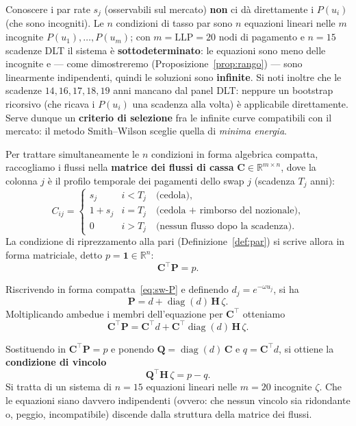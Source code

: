 \documentclass[11pt,a4paper]{article}
\theoremstyle{plain}
\theoremstyle{definition}
\theoremstyle{remark}
\newcommand{\LLP}{\ensuremath{\mathrm{LLP}}}
\newcommand{\Qmat}{\mathbf{Q}}
\newcommand{\Hmat}{\mathbf{H}}
\newcommand{\transp}{^{\!\top}}
\begin{document}
Conoscere i par rate $s_j$ (osservabili sul mercato) \textbf{non} ci d\`a direttamente i
$P(u_i)$ (che sono incogniti). Le $n$ condizioni di tasso par sono $n$ equazioni lineari nelle $m$
incognite $P(u_1),\ldots,P(u_m)$; con $m = \LLP = 20$ nodi di pagamento e $n = 15$ scadenze
DLT il sistema \`e \textbf{sottodeterminato}: le equazioni sono meno delle incognite e ---
come dimostreremo (Proposizione~\ref{prop:rango}) --- sono linearmente indipendenti, quindi
le soluzioni sono \textbf{infinite}. Si noti inoltre che le scadenze $14, 16, 17, 18, 19$
anni mancano dal panel DLT: neppure un bootstrap ricorsivo (che ricava i $P(u_i)$ una
scadenza alla volta) \`e applicabile direttamente. Serve dunque un \textbf{criterio di
selezione} fra le infinite curve compatibili con il mercato: il metodo Smith--Wilson
sceglie quella di \emph{minima energia}.

Per trattare simultaneamente le $n$ condizioni in forma algebrica compatta, raccogliamo i
flussi nella \textbf{matrice dei flussi di cassa} $\mathbf{C}\in\mathbb{R}^{m\times n}$,
dove la colonna $j$ \`e il profilo temporale dei pagamenti dello swap $j$ (scadenza $T_j$ anni):
\[
  C_{ij} =
  \begin{cases}
    s_j     & i < T_j \quad\text{(cedola),}\\
    1 + s_j & i = T_j \quad\text{(cedola + rimborso del nozionale),}\\
    0        & i > T_j \quad\text{(nessun flusso dopo la scadenza).}
  \end{cases}
\]
La condizione di riprezzamento alla pari (Definizione~\ref{def:par}) si scrive allora in forma
matriciale, detto $p = \mathbf{1} \in \mathbb{R}^n$:
\[
  \mathbf{C}\transp \mathbf{P} = p .
\]

Riscrivendo in forma compatta~\eqref{eq:sw-P} e definendo $d_j = e^{-\omega u_j}$, si ha
\[
  \mathbf{P} = d + \operatorname{diag}(d)\,\Hmat\,\zeta .
\]
Moltiplicando ambedue i membri dell'equazione per $\mathbf{C}\transp$ otteniamo
\[
  \mathbf{C}\transp \mathbf{P} = \mathbf{C}\transp d + \mathbf{C}\transp \operatorname{diag}(d)\,\Hmat\,\zeta .
\]

Sostituendo in $\mathbf{C}\transp \mathbf{P} = p$ e ponendo
$\Qmat = \operatorname{diag}(d)\,\mathbf{C}$ e $q = \mathbf{C}\transp d$, si ottiene la
\textbf{condizione di vincolo}
\begin{equation}
  \Qmat\transp \Hmat\, \zeta = p - q .
  \label{eq:vincolo}
\end{equation}
Si tratta di un sistema di $n=15$ equazioni lineari nelle $m=20$ incognite $\zeta$. Che le
equazioni siano davvero indipendenti (ovvero: che nessun vincolo sia ridondante o, peggio,
incompatibile) discende dalla struttura della matrice dei flussi.
\end{document}
